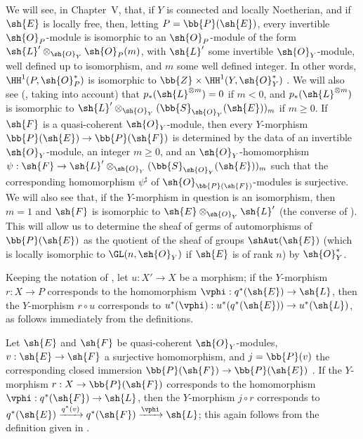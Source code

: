 \begin{remark}[4.2.7]
\label{II.4.2.7}
We will see, in Chapter~V, that, if $Y$ is connected and locally Noetherian, and if $\sh{E}$ is locally free, then, letting $P=\bb{P}(\sh{E})$, every invertible $\sh{O}_P$-module is isomorphic to an $\sh{O}_P$-module of the form $\sh{L}'\otimes_{\sh{O}_Y}\sh{O}_P(m)$, with $\sh{L}'$ some invertible $\sh{O}_Y$-module, well defined up to isomorphism, and $m$ some well defined integer.
In other words, $\HH^1(P,\sh{O}_P^*)$ is isomorphic to $\bb{Z}\times\HH^1(Y,\sh{O}_Y^*)$ .
We will also see (, taking  into account) that $p_*(\sh{L}^{\otimes m})=0$ if $m<0$, and $p_*(\sh{L}^{\otimes m})$ is isomorphic to $\sh{L}'\otimes_{\sh{O}_Y}(\bb{S}_{\sh{O}_Y}(\sh{E}))_m$ if $m\geq0$.
If $\sh{F}$ is a quasi-coherent $\sh{O}_Y$-module, then every $Y$-morphism $\bb{P}(\sh{E})\to\bb{P}(\sh{F})$ is determined by the data of an invertible $\sh{O}_Y$-module, an integer $m\geq0$, and an $\sh{O}_Y$-homomorphism $\psi:\sh{F}\to\sh{L}'\otimes_{\sh{O}_Y}(\bb{S}_{\sh{O}_Y}(\sh{E}))_m$ such that the corresponding homomorphism $\psi^\sharp$ of $\sh{O}_{\bb{P}(\sh{F})}$-modules is surjective.
We will also see that, if the $Y$-morphism in question is an isomorphism, then $m=1$ and $\sh{F}$ is isomorphic to $\sh{E}\otimes_{\sh{O}_Y}\sh{L}'$ (the converse of ).
This will allow us to determine the sheaf of germs of automorphisms of $\bb{P}(\sh{E})$ as the quotient of the sheaf of groups $\shAut(\sh{E})$ (which is locally isomorphic to $\GL(n,\sh{O}_Y)$ if $\sh{E}$ is of rank $n$) by $\sh{O}_Y^*$.
\end{remark}

\begin{env}[4.2.8]
\label{II.4.2.8}
Keeping the notation of , let $u:X'\to X$ be a morphism;
if the $Y$-morphism $r:X\to P$ corresponds to the homomorphism $\vphi:q^*(\sh{E})\to\sh{L}$, then the $Y$-morphism $r\circ u$ corresponds to $u^*(\vphi):u^*(q^*(\sh{E}))\to u^*(\sh{L})$, as follows immediately from the definitions.
\end{env}

\begin{env}[4.2.9]
\label{II.4.2.9}
Let $\sh{E}$ and $\sh{F}$ be quasi-coherent $\sh{O}_Y$-modules, $v:\sh{E}\to\sh{F}$ a surjective homomorphism, and $j=\bb{P}(v)$ the corresponding closed immersion $\bb{P}(\sh{F})\to\bb{P}(\sh{E})$ .
If the $Y$-morphism $r:X\to\bb{P}(\sh{F})$ corresponds to the homomorphism $\vphi:q^*(\sh{F})\to\sh{L}$, then the
$Y$-morphism $j\circ r$ corresponds to $q^*(\sh{E})\xrightarrow{q^*(v)}q^*(\sh{F})\xrightarrow{\vphi}\sh{L}$;
this again follows from the definition given in .
\end{env}

